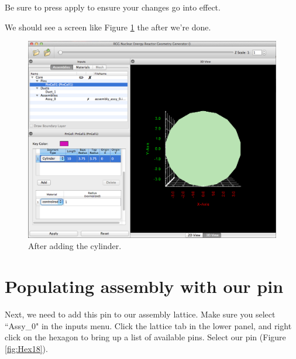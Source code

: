 Be sure to press apply to ensure your changes go into effect.

We should see a screen like Figure \ref{fig:Hex14} the after we're done.

\begin{figure}[H]
	\begin{center}
		\includegraphics[width=0.85\linewidth]{Images/hex-final-pin.png}
		\caption{After adding the cylinder.}
		\label{fig:Hex14}
	\end{center}
\end{figure}

\section{Populating assembly with our pin}

Next, we need to add this pin to our assembly lattice.  Make sure you select ``Assy\_0" in the inputs menu.  Click the lattice tab in the lower panel, and right click on the hexagon to bring up a list of available pins.  Select our pin (Figure \ref{fig:Hex18}).

